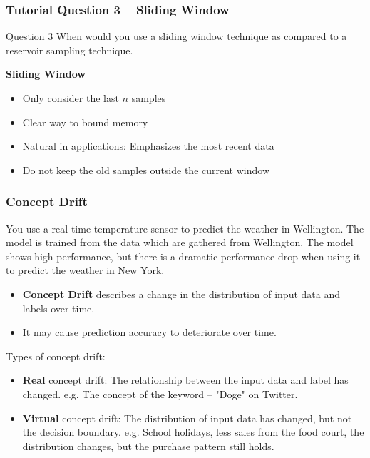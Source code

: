 \documentclass[aspectratio=169, 10pt]{beamer}
\begin{document}
\begin{frame}
    \frametitle{Tutorial Question 3 -- Sliding Window}
    
    \begin{block}{Question 3}
        When would you use a sliding window technique as compared to a reservoir sampling technique.
    \end{block}

    \textbf{Sliding Window}
    \begin{itemize}
        \item Only  consider the last $n$ samples
        \item Clear way to bound memory
        \item Natural in applications: Emphasizes the most recent data
        \item Do not keep the old samples outside the current window
    \end{itemize}
\end{frame}

\begin{frame}
    \frametitle{Concept Drift}
    \begin{example}
        You use a real-time temperature sensor to predict the weather in Wellington.
        The model is trained from the data which are gathered from Wellington. The model shows high performance, 
        but there is a dramatic performance drop when using it to predict the weather in New York.
    \end{example}

    \begin{itemize}
        \item \textbf{Concept Drift} describes a change in the distribution of input data and labels over time.
        \item It may cause prediction accuracy to deteriorate over time.
    \end{itemize}
    
    Types of concept drift:
    \begin{itemize}
        \item \textbf{Real} concept drift: The relationship between the input data and label has changed. e.g. The concept of the keyword -- "Doge" on Twitter.
        \item \textbf{Virtual} concept drift: The distribution of input data has changed, but not the decision boundary. e.g. School holidays, less sales from the food court, the distribution changes, but the purchase pattern still holds.
    \end{itemize}
\end{frame}
\end{document}

